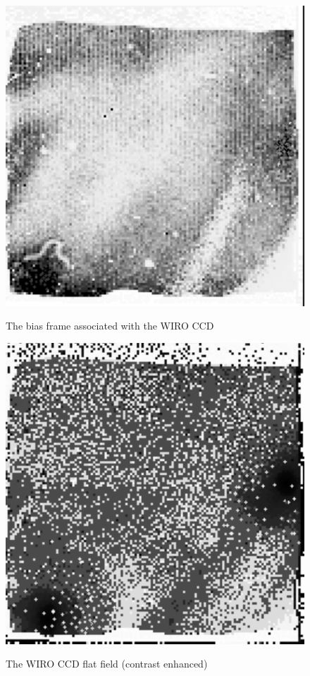 \documentclass[twoside,11pt]{starlink}
\begin{document}
\begin{figure}[htbp]
   \centering
   \includegraphics[totalheight=3.5in]{sc5_m51_bias}
   \begin{quote}
   \caption{The bias frame associated with the WIRO CCD
   \label{M51_BIAS} }
   \end{quote}
\end{figure}

\begin{figure}[htbp]
   \centering
   \includegraphics[totalheight=3.5in]{sc5_m51_flat}
   \begin{quote}
   \caption{The WIRO CCD flat field (contrast enhanced)
   \label{M51_FLAT} }
   \end{quote}
\end{figure}
\end{document}
